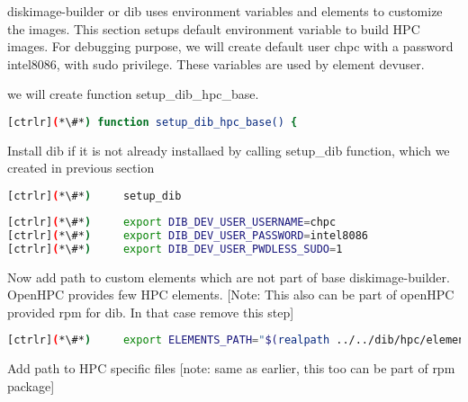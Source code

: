 
diskimage-builder or dib uses environment variables and elements to customize the images. This section setups default environment variable to build HPC images. For debugging purpose, we will create default user chpc with a password intel8086, with sudo privilege. These variables are used by element devuser. 

we will create function setup\_dib\_hpc\_base.

\begin{lstlisting}[language=bash,keywords={}]
[ctrlr](*\#*) function setup_dib_hpc_base() {
\end{lstlisting}

Install dib if it is not already installaed by calling setup\_dib function, which we created in previous section

\begin{lstlisting}[language=bash,keywords={}]
[ctrlr](*\#*)     setup_dib
\end{lstlisting}

\begin{lstlisting}[language=bash,keywords={}]
[ctrlr](*\#*)     export DIB_DEV_USER_USERNAME=chpc
[ctrlr](*\#*)     export DIB_DEV_USER_PASSWORD=intel8086
[ctrlr](*\#*)     export DIB_DEV_USER_PWDLESS_SUDO=1
\end{lstlisting}

Now add path to custom elements which are not part of base diskimage-builder. OpenHPC provides few HPC elements. [Note: This also can be part of openHPC provided rpm for dib. In that case remove this step]

\begin{lstlisting}[language=bash,keywords={}]
[ctrlr](*\#*)     export ELEMENTS_PATH="$(realpath ../../dib/hpc/elements)"
\end{lstlisting}

Add path to HPC specific files [note: same as earlier, this too can be part of rpm package]

